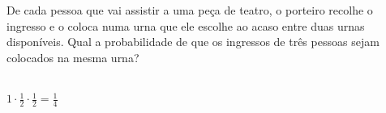 \begin{ex}
 	De cada pessoa que vai assistir a uma peça de teatro, o porteiro recolhe o ingresso e o coloca numa urna que ele escolhe ao acaso entre duas urnas disponíveis. Qual a probabilidade de que os ingressos de três pessoas sejam colocados na mesma urna?
 	  \begin{sol}
 	    \phantom{A} \\
 	    $1\cdot\frac{1}{2}\cdot\frac{1}{2}=\frac{1}{4}$
 	  \end{sol}
\end{ex}